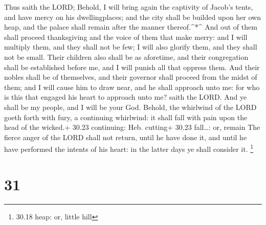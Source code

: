 Thus saith the LORD; Behold, I will bring again the
captivity of Jacob's tents, and have mercy on his dwellingplaces; and
the city shall be builded upon her own heap, and the palace shall remain
after the manner thereof.\^{}*\^{}  And out of them shall
proceed thanksgiving and the voice of them that make merry: and I will
multiply them, and they shall not be few; I will also glorify them, and
they shall not be small.  Their children also shall be as
aforetime, and their congregation shall be established before me, and I
will punish all that oppress them.  And their nobles shall
be of themselves, and their governor shall proceed from the midst of
them; and I will cause him to draw near, and he shall approach unto me:
for who is this that engaged his heart to approach unto me? saith the
LORD.  And ye shall be my people, and I will be your God.
 Behold, the whirlwind of the LORD goeth forth with fury, a
continuing whirlwind: it shall fall with pain upon the head of the
wicked.+ 30.23 continuing: Heb. cutting+ 30.23 fall\ldots: or, remain
 The fierce anger of the LORD shall not return, until he
have done it, and until he have performed the intents of his heart: in
the latter days ye shall consider it. \footnote{30.18 heap: or, little
  hill}

\hypertarget{section-30}{%
\section{31}\label{section-30}}

